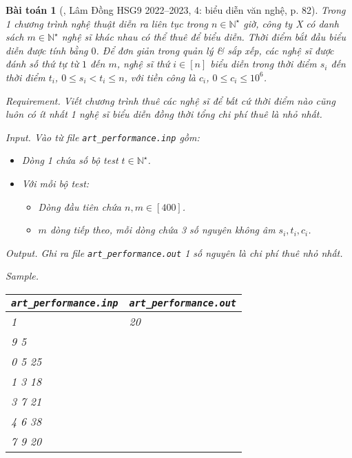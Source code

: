 \documentclass{article}
\newtheorem{baitoan}{Bài toán}
\begin{document}
\begin{baitoan}[\cite{Trung_THCS_Tin}, Lâm Đồng HSG9 2022--2023, 4: biểu diễn văn nghệ, p. 82]
	Trong 1 chương trình nghệ thuật diễn ra liên tục trong $n\in\mathbb{N}^\star$ giờ, công ty X có danh sách $m\in\mathbb{N}^\star$ nghệ sĩ khác nhau có thể thuê để biểu diễn. Thời điểm bắt đầu biểu diễn được tính bằng $0$. Để đơn giản trong quản lý \& sắp xếp, các nghệ sĩ được đánh số thứ tự từ $1$ đến $m$, nghệ sĩ thứ $i\in[n]$ biểu diễn trong thời điểm $s_i$ đến thời điểm $t_i$, $0\le s_i < t_i\le n$, với tiền công là $c_i$, $0\le c_i\le10^6$.
	\item {\sf Requirement.} Viết chương trình thuê các nghệ sĩ để bất cứ thời điểm nào cũng luôn có ít nhất 1 nghệ sĩ biểu diễn đồng thời tổng chi phí thuê là nhỏ nhất.
	\item {\sf Input.} Vào từ file \verb|art_performance.inp| gồm:
	\begin{itemize}
		\item Dòng 1 chứa số bộ test $t\in\mathbb{N}^\star$.
		\item Với mỗi bộ test:
		\begin{itemize}
			\item Dòng đầu tiên chứa $n,m\in[400]$.
			\item $m$ dòng tiếp theo, mỗi dòng chứa 3 số nguyên không âm $s_i,t_i,c_i$.
		\end{itemize}
	\end{itemize}
	\item {\sf Output.} Ghi ra file \verb|art_performance.out| 1 số nguyên là chi phí thuê nhỏ nhất.
	\item {\sf Sample.}
	\begin{table}[H]
		\centering
		\begin{tabular}{|l|l|}
			\hline
			\verb|art_performance.inp| & \verb|art_performance.out| \\
			\hline
			1 & 20 \\
			9 5 &  \\
			0 5 25 & \\
			1 3 18 & \\
			3 7 21 & \\
			4 6 38 & \\
			7 9 20 & \\
			\hline
		\end{tabular}
	\end{table}
\end{baitoan}
\end{document}
